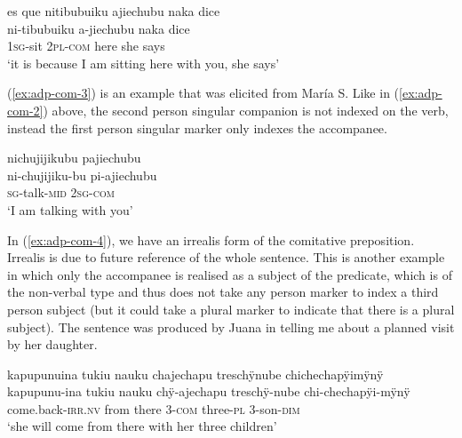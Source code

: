 \ea\label{ex:adp-com-2}
\begingl
\glpreamble es que nitibubuiku ajiechubu naka dice\\
 ni-tibubuiku a-jiechubu naka {dice}\\
 1\textsc{sg}-sit 2\textsc{pl}-\textsc{com} here {she says}\\
\glft ‘it is because I am sitting here with you, she says’
\endgl
\trailingcitation{[cux-120410ls.222]}
\xe

(\ref{ex:adp-com-3}) is an example that was elicited from María S. Like in (\ref{ex:adp-com-2}) above, the second person singular companion is not indexed on the verb, instead the first person singular marker only indexes the accompanee.

\ea\label{ex:adp-com-3}
\begingl
\glpreamble nichujijikubu pajiechubu\\
\gla ni-chujijiku-bu pi-ajiechubu\\
\textsc{sg}-talk-\textsc{mid} 2\textsc{sg}-\textsc{com}\\
\glft ‘I am talking with you’
\endgl
\trailingcitation{[rxx-e141230s.133]} %
\xe

In (\ref{ex:adp-com-4}), we have an irrealis form of the comitative preposition. Irrealis is due to future reference of the whole sentence. This is another example in which only the accompanee is realised as a subject of the predicate, which is of the non-verbal type and thus does not take any person marker to index a third person subject (but it could take a plural marker to indicate that there is a plural subject). The sentence was produced by Juana in telling me about a planned visit by her daughter.
\newpage

\ea\label{ex:adp-com-4}
\begingl
\glpreamble kapupunuina tukiu nauku chajechapu treschÿnube chichechapÿimÿnÿ\\
\gla kapupunu-ina tukiu nauku chÿ-ajechapu treschÿ-nube chi-chechapÿi-mÿnÿ\\
\glb come.back-\textsc{irr.nv} from there 3-\textsc{com} three-\textsc{pl} 3-son-\textsc{dim}\\
\glft ‘she will come from there with her three children’
\endgl
\trailingcitation{[jxx-p110923l-1.253-254]}
\xe

